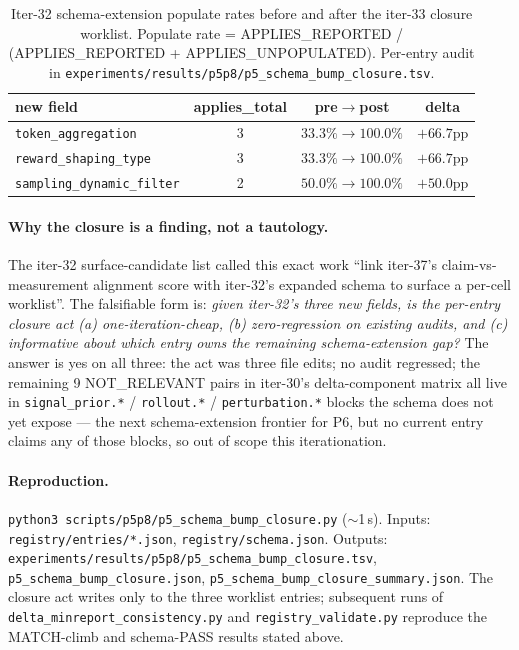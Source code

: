 \documentclass{article}  \usepackage[preprint,nonatbib]{neurips_2026} \usepackage[numbers]{natbib}
\begin{document}
\begin{table}[t]
\centering
\small
\caption{Iter-32 schema-extension populate rates before and after the
iter-33 closure worklist. Populate rate = APPLIES\_REPORTED /
(APPLIES\_REPORTED + APPLIES\_UNPOPULATED).
Per-entry audit in
\texttt{experiments/results/p5p8/p5\_schema\_bump\_closure.tsv}.}
\label{tab:p5-schema-bump}
\begin{tabular}{lccc}
\toprule
new field & applies\_total & pre$\rightarrow$post & delta \\
\midrule
\texttt{token\_aggregation}        & 3 & $33.3\%\rightarrow\mathbf{100.0\%}$ & $+66.7$pp \\
\texttt{reward\_shaping\_type}      & 3 & $33.3\%\rightarrow\mathbf{100.0\%}$ & $+66.7$pp \\
\texttt{sampling\_dynamic\_filter}  & 2 & $50.0\%\rightarrow\mathbf{100.0\%}$ & $+50.0$pp \\
\bottomrule
\end{tabular}
\end{table}

\paragraph{Why the closure is a finding, not a tautology.}
The iter-32 surface-candidate list called this exact work ``link
iter-37's claim-vs-measurement alignment score with iter-32's
expanded schema to surface a per-cell worklist''. The falsifiable
form is: \emph{given iter-32's three new fields, is the per-entry
closure act (a) one-iteration-cheap, (b) zero-regression on
existing audits, and (c) informative about which entry owns the
remaining schema-extension gap?} The answer is yes on all three:
the act was three file edits; no audit regressed; the remaining
9 NOT\_RELEVANT pairs in iter-30's delta-component matrix all live
in \texttt{signal\_prior.*} / \texttt{rollout.*} /
\texttt{perturbation.*} blocks the schema does not yet expose ---
the next schema-extension frontier for P6, but no current entry
claims any of those blocks, so out of scope this iterationation.

\paragraph{Reproduction.}
\texttt{python3 scripts/p5p8/p5\_schema\_bump\_closure.py}
($\sim$1\,s). Inputs: \texttt{registry/entries/*.json},
\texttt{registry/schema.json}. Outputs:
\texttt{experiments/results/p5p8/p5\_schema\_bump\_closure.tsv},
\texttt{p5\_schema\_bump\_closure.json},
\texttt{p5\_schema\_bump\_closure\_summary.json}. The closure act
writes only to the three worklist entries; subsequent runs of
\texttt{delta\_minreport\_consistency.py} and
\texttt{registry\_validate.py} reproduce the MATCH-climb and
schema-PASS results stated above.
\end{document}
